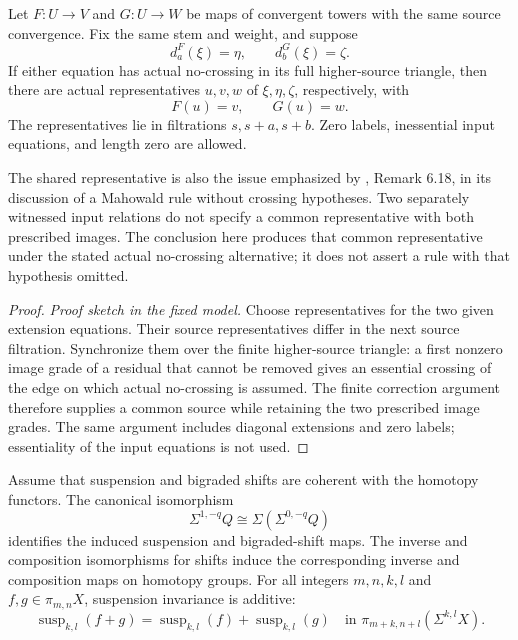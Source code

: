 \begin{theorem}
\label{sem:ProofTools:mh-common-source}
Let $F:U\to V$ and $G:U\to W$ be maps of convergent towers with the same source convergence. Fix the same stem and weight, and suppose
\[
d_a^F(\xi)=\eta,\qquad d_b^G(\xi)=\zeta.
\]
If either equation has actual no-crossing in its full higher-source triangle, then there are actual representatives $u,v,w$ of $\xi,\eta,\zeta$, respectively, with
\[F(u)=v,\qquad G(u)=w.\]
The representatives lie in filtrations $s,s+a,s+b$. Zero labels, inessential input equations, and length zero are allowed.

The shared representative is also the issue emphasized by \cite{LWX126}, Remark 6.18, in its discussion of a Mahowald rule without crossing hypotheses. Two separately witnessed input relations do not specify a common representative with both prescribed images. The conclusion here produces that common representative under the stated actual no-crossing alternative; it does not assert a rule with that hypothesis omitted.
\end{theorem}
\begin{proof}
\textit{Proof sketch in the fixed model.}
Choose representatives for the two given extension equations. Their source representatives differ in the next source filtration. Synchronize them over the finite higher-source triangle: a first nonzero image grade of a residual that cannot be removed gives an essential crossing of the edge on which actual no-crossing is assumed. The finite correction argument therefore supplies a common source while retaining the two prescribed image grades. The same argument includes diagonal extensions and zero labels; essentiality of the input equations is not used.
\end{proof}

Assume that suspension and bigraded shifts are coherent with the homotopy functors. The canonical isomorphism
\[\Sigma^{1,-q}Q\cong\Sigma(\Sigma^{0,-q}Q)\]
identifies the induced suspension and bigraded-shift maps. The inverse and composition isomorphisms for shifts induce the corresponding inverse and composition maps on homotopy groups.
For all integers $m,n,k,l$ and $f,g\in\pi_{m,n}X$, suspension invariance is additive:
\[
\operatorname{susp}_{k,l}(f+g)=\operatorname{susp}_{k,l}(f)+\operatorname{susp}_{k,l}(g)
\quad\text{in }\pi_{m+k,n+l}(\Sigma^{k,l}X).
\]

